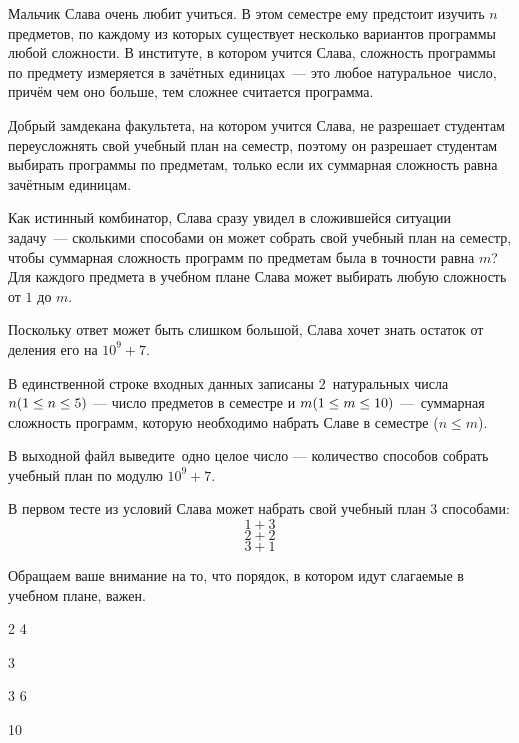 
Мальчик Слава очень любит учиться. В этом семестре ему предстоит изучить $n$ предметов, по каждому из которых существует несколько вариантов программы любой сложности. В институте, в котором учится Слава, сложность программы по предмету измеряется в зачётных единицах — это любое натуральное число, причём чем оно больше, тем сложнее считается программа.

Добрый замдекана факультета, на котором учится Слава, не разрешает студентам переусложнять свой учебный план на семестр, поэтому он разрешает студентам выбирать программы по предметам, только если их суммарная сложность равна  зачётным единицам.

Как истинный комбинатор, Слава сразу увидел в сложившейся ситуации задачу~— сколькими способами он может собрать свой учебный план на семестр, чтобы суммарная сложность программ по предметам была в точности равна $m$? Для каждого предмета в учебном плане Слава может выбирать любую сложность от $1$ до $m$.

Поскольку ответ может быть слишком большой, Слава хочет знать остаток от деления его на $10^9 + 7$.


В единственной строке входных данных записаны $2$ натуральных числа \linebreak $n\space(1\leq n\leq 5)$ — число предметов в семестре и $m\space(1\leq m\leq 10)$ — суммарная сложность программ, которую необходимо набрать Славе в семестре ($n \leq m$).  

\outputfmtSection

В выходной файл выведите одно целое число — количество способов собрать учебный план по модулю $10^9 + 7$.

\explanationSection

В первом тесте из условий Слава может набрать свой учебный план $3$ способами:
$$1+3$$ $$2+2$$ $$3+1$$

Обращаем ваше внимание на то, что порядок, в котором идут слагаемые в учебном плане, важен.


\begin{myverbbox}[\small]{\vinput}
    2 4
\end{myverbbox}

\begin{myverbbox}[\small]{\voutput}
    3
\end{myverbbox}


\begin{myverbbox}[\small]{\vinput}
    3 6
\end{myverbbox}

\begin{myverbbox}[\small]{\voutput}
    10
\end{myverbbox}


